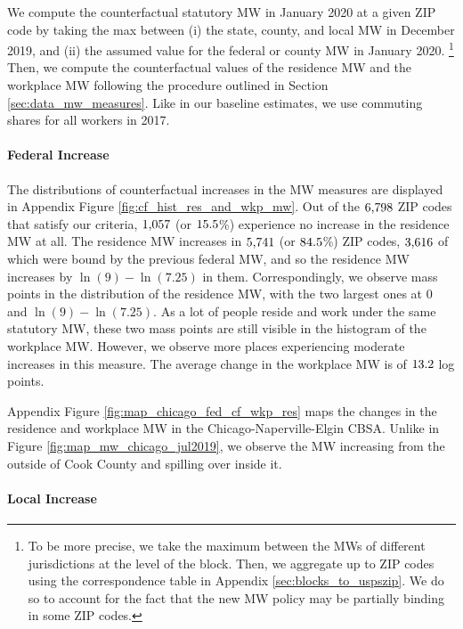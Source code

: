 We compute the counterfactual statutory MW in January 2020 at a given ZIP code 
by taking the max between (i) the state, county, and local MW in December 2019, 
and (ii) the assumed value for the federal or county MW in January 2020.%
\footnote{To be more precise, we take the maximum between the MWs of different
jurisdictions at the level of the block.
Then, we aggregate up to ZIP codes using the correspondence table in Appendix 
\ref{sec:blocks_to_uspszip}.
We do so to account for the fact that the new MW policy may be partially 
binding in some ZIP codes.}
Then, we compute the counterfactual values of the residence MW and the workplace
MW following the procedure outlined in Section \ref{sec:data_mw_measures}.
Like in our baseline estimates, we use commuting shares for all workers in
2017.

\paragraph{Federal Increase}

The distributions of counterfactual increases in the MW measures are displayed 
in Appendix Figure \ref{fig:cf_hist_res_and_wkp_mw}.
Out of the $\textnormal{6,798}$ ZIP codes that satisfy our criteria, 
$\textnormal{1,057}$ (or $\textnormal{15.5}$\%) experience no increase in 
the residence MW at all.
The residence MW increases in $\textnormal{5,741}$ (or $\textnormal{84.5}$\%) ZIP 
codes, $\textnormal{3,616}$ of which were bound by the previous federal MW, and 
so the residence MW increases by $\ln(9)-\ln(7.25)$ in them.
Correspondingly, we observe mass points in the distribution of the residence MW,
with the two largest ones at $0$ and $\ln(9)-\ln(7.25)$.
As a lot of people reside and work under the same statutory MW, these two mass
points are still visible in the histogram of the workplace MW.
However, we observe more places experiencing moderate increases in this measure.
The average change in the workplace MW is of $\textnormal{13.2}$ log points.

Appendix Figure \ref{fig:map_chicago_fed_cf_wkp_res} maps the changes in the 
residence and workplace MW in the Chicago-Naperville-Elgin CBSA.
Unlike in Figure \ref{fig:map_mw_chicago_jul2019}, we observe the MW increasing 
from the outside of Cook County and spilling over inside it.

\paragraph{Local Increase}

